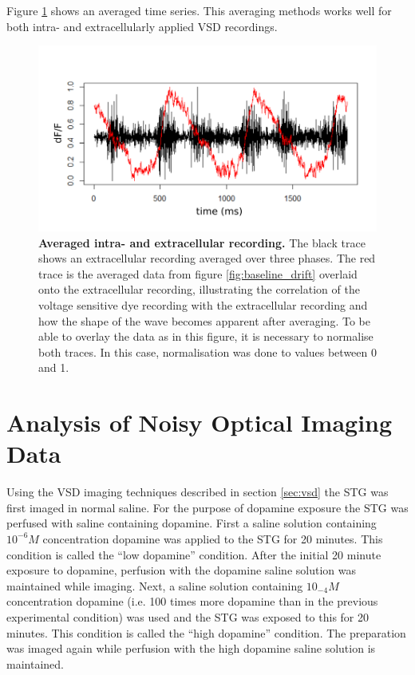 Figure \ref{fig:averaged} shows an averaged time series. This averaging methods works well for both intra- and extracellularly applied \ac{VSD} recordings. 
\begin{figure}[H]
	\begin{center}
		\includegraphics[width=\columnwidth]{graphics/averaged.png}
		\caption[Averaged intra- and extracellular recording.]{\textbf{Averaged intra- and extracellular recording.} The black trace shows an extracellular recording averaged over three phases. The red trace is the averaged data from figure \ref{fig:baseline_drift} overlaid onto the extracellular recording, illustrating the correlation of the voltage sensitive dye recording with the extracellular recording and how the shape of the wave becomes apparent after averaging. To be able to overlay the data as in this figure, it is necessary to normalise both traces. In this case, normalisation was done to values between 0 and 1.}
		\label{fig:averaged}
	\end{center}
\end{figure}

\section{Analysis of Noisy Optical Imaging Data}
\label{sec:analysis_methods}

Using the \ac{VSD} imaging techniques described in section \ref{sec:vsd} the \ac{STG} was first imaged in normal saline. For the purpose of dopamine exposure the \ac{STG} was perfused with saline containing dopamine. First a saline solution containing $10^{-6}M$ concentration dopamine was applied to the \ac{STG} for 20 minutes. This condition is called the ``low dopamine'' condition. After the initial 20 minute exposure to dopamine, perfusion with the dopamine saline solution was maintained while imaging. Next, a saline solution containing $10_{-4}M$ concentration dopamine (i.e. 100 times more dopamine than in the previous experimental condition) was used and the \ac{STG} was exposed to this for 20 minutes. This condition is called the ``high dopamine'' condition. The preparation was imaged again while perfusion with the high dopamine saline solution is maintained.

